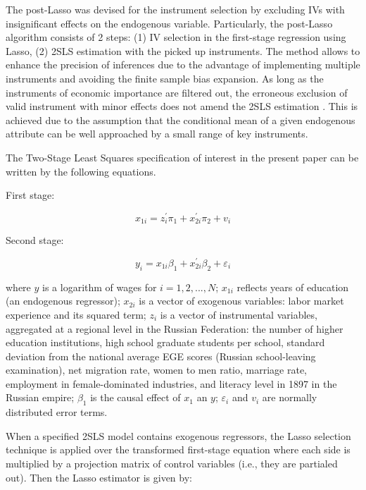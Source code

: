 \documentclass[alpha-refs]{wiley-article-04t}
\begin{document}
The post-Lasso was devised for the instrument selection by excluding IVs with insignificant effects on the endogenous variable. Particularly, the post-Lasso algorithm consists of 2 steps: (1) IV selection in the first-stage regression using Lasso, (2) 2SLS estimation with the picked up instruments. The method allows to enhance the precision of inferences due to the advantage of implementing multiple instruments and avoiding the finite sample bias expansion. As long as the instruments of economic importance are filtered out, the erroneous exclusion of valid instrument with minor effects does not amend the 2SLS estimation \citep{belloni_high-dimensional_2014}. This is achieved due to the assumption that the conditional mean of a given endogenous attribute can be well approached by a small range of key instruments.

The Two-Stage Least Squares specification of interest in the present paper can be written by the following equations.

First stage:

\begin{equation}
x_{1i}=z_{i}^{\prime} \pi_{1}+x_{2i}^{\prime} \pi_{2}+v_{i}
\end{equation}

Second stage:

\begin{equation}
y_{i}=x_{1 i} \beta_{1}+x_{2i}^{\prime} \beta_{2}+\varepsilon_{i}
\end{equation}

\noindent
where $y$ is a logarithm of wages for $i = 1,2,...,N$; $x_{1i}$ reflects years of education (an endogenous regressor); $x_{2i}$ is a vector of exogenous variables: labor market experience and its squared term; $z_{i}$ is a vector of instrumental variables, aggregated at a regional level in the Russian Federation: the number of higher education institutions, high school graduate students per school, standard deviation from the national average EGE scores (Russian school-leaving examination), net migration rate, women to men ratio, marriage rate, employment in female-dominated industries, and literacy level in 1897 in the Russian empire; $\beta_{1}$ is the causal effect of $x_{1}$ an $y$; $\varepsilon_{i}$ and $v_{i}$ are normally distributed error terms.

When a specified 2SLS model contains exogenous regressors, the Lasso selection technique is applied over the transformed first-stage equation where each side is multiplied by a projection matrix of control variables (i.e., they are partialed out). Then the Lasso estimator is given by: 
\end{document}
